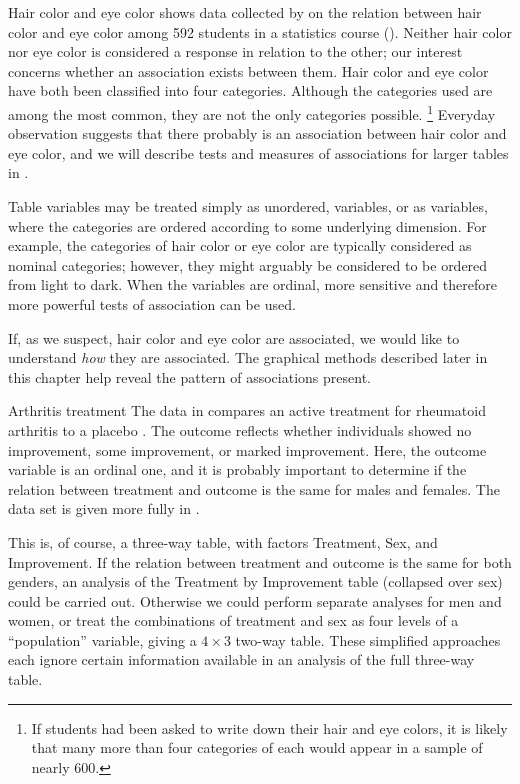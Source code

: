 \begin{Example}[haireye1]{Hair color and eye color}
 shows data collected by
\citet{Snee:74}
on the relation between hair color and eye color among 592
students in a statistics course
().  Neither hair color nor eye color
is considered a response in relation to the other;  our interest concerns
whether an association exists between them.
Hair color and eye color have both been classified
into four categories.  Although the categories used are among the most
common, they are not the only categories possible.%
\footnote{If students had been asked to write down their hair and eye
colors, it is likely that many more than four categories of each
would appear in a sample of nearly 600.}
Everyday observation suggests that there probably is an association
between hair color and eye color, and we will describe tests
and measures of associations for larger tables in
.

\end{Example}

Table variables may be treated simply as unordered,
 variables,  or as
 variables, where the categories are
ordered according to some underlying dimension.
For example, the categories of hair color or eye color
are typically considered as nominal categories;
however, they
might arguably be considered to be ordered from light to dark.
When the variables are ordinal, more sensitive
and therefore more powerful tests of association can be used.

If, as we suspect, hair color and eye color are associated,
we would like to understand \emph{how} they are associated.
The graphical methods described later in this chapter help
reveal the pattern of associations present.

\begin{Example}[arthrit1]{Arthritis treatment}
The data in  compares an active treatment for rheumatoid
arthritis to a placebo
\citep{KochEdwards:88}.
The outcome reflects
whether individuals showed no improvement, some improvement, or
marked improvement.
Here, the outcome variable is an ordinal one, and it is probably
important to determine if the relation between treatment and outcome
is the same for males and females.
The data set is given more fully in .

This is, of course, a three-way table, with factors
Treatment, Sex, and Improvement.
If the relation between treatment and outcome is the same for
both genders, an analysis of the Treatment by Improvement
table (collapsed over sex) could be carried out.
Otherwise we could perform separate analyses for
men and women, or
treat the combinations of treatment and sex as four levels of
a ``population'' variable, giving a $4 \times 3$ two-way table.
These simplified approaches each ignore certain information
available in
an analysis of the full three-way table.

\end{Example}

